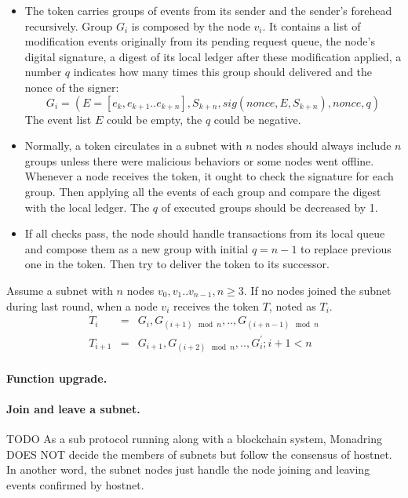 \documentclass[11pt]{article}
\begin{document}
\begin{itemize}
\item The token carries groups of events from its sender and the sender{'}s forehead recursively.
Group $G_{i}$ is composed by the node $v_{i}$. It contains a list of modification events originally from its pending request queue, the node{'}s digital signature, a digest of its local ledger after these modification applied, a number $q$ indicates how many times this group should delivered and the nonce of the signer:
\begin{equation}
G_{i} = (E = [e_{k}, e_{k+1}..e_{k+n}], S_{k+n}, sig(nonce, E, S_{k+n}), nonce, q)
\end{equation}
The event list $E$ could be empty, the $q$ could be negative.

\item Normally, a token circulates in a subnet with $n$ nodes should always include $n$ groups unless there were malicious behaviors or some nodes went offline.
Whenever a node receives the token, it ought to check the signature for each group.
Then applying all the events of each group and compare the digest with the local ledger.
The $q$ of executed groups should be decreased by 1.

\item If all checks pass, the node should handle transactions from its local queue and compose them as a new group with initial $q=n-1$ to replace previous one in the token.
Then try to deliver the token to its successor.
\end{itemize}

Assume a subnet with $n$ nodes \( v_{0}, v_{1} .. v_{n-1}, n\geq 3\). If no nodes joined the subnet during last round, when a node $v_{i}$ receives the token $T$, noted as $T_{i}$.
\begin{eqnarray}
T_{i} &=& G_{i}, G_{(i + 1)\mod n},.., G_{(i + n - 1)\mod n}\\
T_{i+1} &=& G_{i+1}, G_{(i+2)\mod n},..,G_{i}^{\prime}; i+1<n
\end{eqnarray}

\paragraph{Function upgrade.}


\paragraph{Join and leave a subnet.} TODO
As a sub protocol running along with a blockchain system, Monadring DOES NOT decide the members of subnets but follow the consensus of hostnet.
In another word, the subnet nodes just handle the node joining and leaving events confirmed by hostnet.
\end{document}
